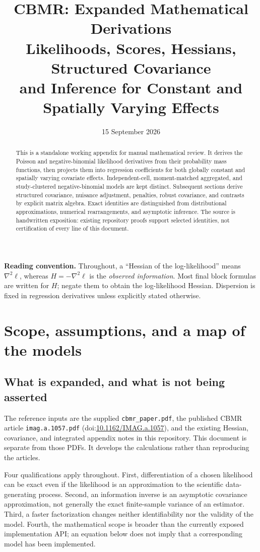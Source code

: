 \documentclass[11pt,a4paper]{article}
\title{CBMR: Expanded Mathematical Derivations\\
  \large Likelihoods, Scores, Hessians, Structured Covariance\\
  and Inference for Constant and Spatially Varying Effects}
\author{}
\date{15 September 2026}
\numberwithin{equation}{section}
\begin{document}
\maketitle
\begin{abstract}
This is a standalone working appendix for manual mathematical review.
It derives the Poisson and negative-binomial likelihood derivatives from
their probability mass functions, then projects them into regression
coefficients for both globally constant and spatially varying covariate
effects. Independent-cell, moment-matched aggregated, and study-clustered
negative-binomial models are kept distinct. Subsequent sections derive
structured covariance, nuisance adjustment, penalties, robust covariance,
and contrasts by explicit matrix algebra.
Exact identities are distinguished from distributional approximations,
numerical rearrangements, and asymptotic inference. The source is handwritten
exposition: existing repository proofs support selected identities, not
certification of every line of this document.
\end{abstract}
\noindent\textbf{Reading convention.}
Throughout, a ``Hessian of the log-likelihood'' means
$\nabla^2\ell$, whereas $H=-\nabla^2\ell$ is the
\emph{observed information}. Most final block formulas are written for
$H$; negate them to obtain the log-likelihood Hessian.
Dispersion is fixed in regression derivatives unless explicitly stated otherwise.

\tableofcontents
\clearpage

\section{Scope, assumptions, and a map of the models}\label{sec:scope}

\subsection{What is expanded, and what is not being asserted}
The reference inputs are the supplied \texttt{cbmr\_paper.pdf},
the published CBMR article \texttt{imag.a.1057.pdf}
(doi:\href{https://doi.org/10.1162/IMAG.a.1057}{10.1162/IMAG.a.1057}),
and the existing Hessian, covariance, and integrated appendix notes in
this repository. This document is separate from those PDFs.
It develops the calculations rather than reproducing the articles.

Four qualifications apply throughout.
First, differentiation of a chosen likelihood can be exact even if the
likelihood is an approximation to the scientific data-generating process.
Second, an information inverse is an asymptotic covariance approximation,
not generally the exact finite-sample variance of an estimator.
Third, a faster factorization changes neither identifiability nor the
validity of the model. Fourth, the mathematical scope is broader than
the currently exposed implementation API; an equation below does not
imply that a corresponding model has been implemented.
\end{document}
